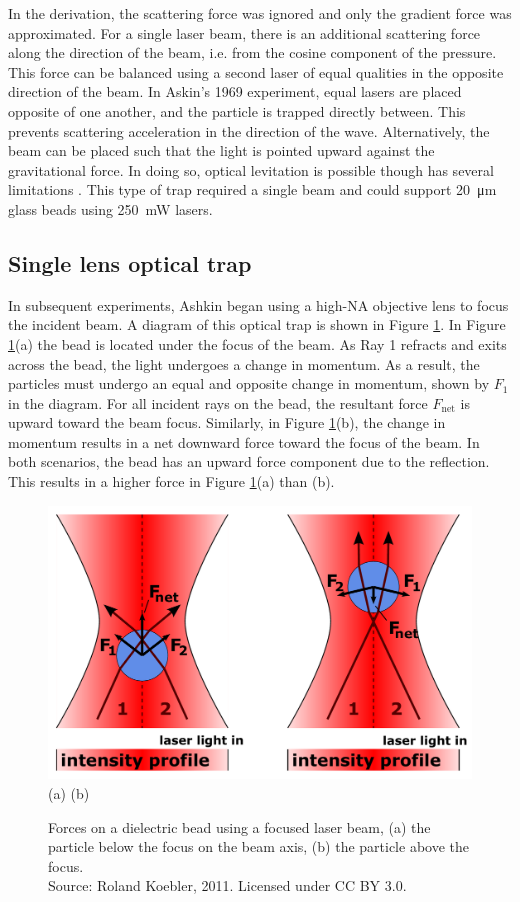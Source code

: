 \documentclass{article}
\begin{document}
	In the derivation, the scattering force was ignored and only the gradient force was approximated. For a single laser beam, there is an additional scattering force along the direction of the beam, i.e. from the cosine component of the pressure. This force can be balanced using a second laser of equal qualities in the opposite direction of the beam. In Askin's 1969 experiment, equal lasers are placed opposite of one another, and the particle is trapped directly between\cite{PhysRevLett.24.156}. This prevents scattering acceleration in the direction of the wave. Alternatively, the beam can be placed such that the light is pointed upward against the gravitational force. In doing so, optical levitation is possible though has several limitations \cite{doi:10.1063/1.1653919}. This type of trap required a single beam and could support \SI{20}{\um} glass beads using \SI{250}{\mW} lasers.

	\subsection{Single lens optical trap}
	In subsequent experiments, Ashkin began using a high-NA objective lens to focus the incident beam. A diagram of this optical trap is shown in Figure \ref{fig:opticaltrapfocused}. In Figure \ref{fig:opticaltrapfocused}(a) the bead is located under the focus of the beam. As Ray 1 refracts and exits across the bead, the light undergoes a change in momentum. As a result, the particles must undergo an equal and opposite change in momentum, shown by $F_1$ in the diagram. For all incident rays on the bead, the resultant force $F_\mathrm{net}$ is upward toward the beam focus. Similarly, in Figure \ref{fig:opticaltrapfocused}(b), the change in momentum results in a net downward force toward the focus of the beam. In both scenarios, the bead has an upward force component due to the reflection. This results in a higher force in Figure \ref{fig:opticaltrapfocused}(a) than (b).
	
	
	\begin{figure}
		\centering
		\includegraphics[width=0.7\linewidth]{Optical_trap_focused}
		\\
		(a) \hspace{16.4em} (b)
		
		\caption{{Forces on a dielectric bead using a focused laser beam, (a) the particle below the focus on the beam axis, (b) the particle above the focus. \\ {\small Source: Roland Koebler, 2011. Licensed under CC BY 3.0.}}}
		\label{fig:opticaltrapfocused}
	\end{figure}
	
\end{document}
